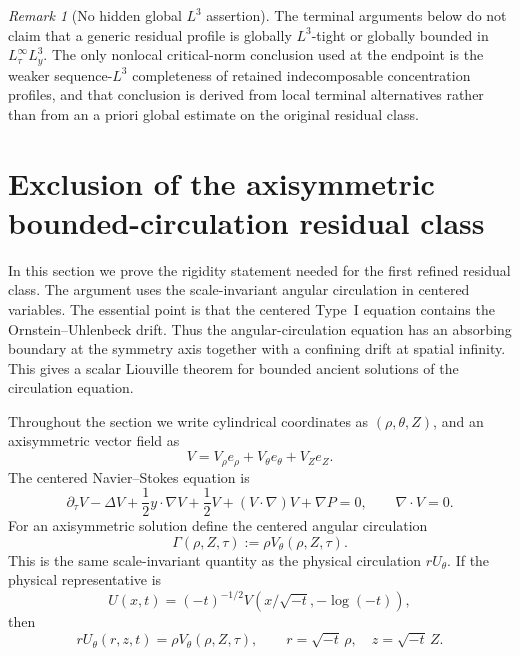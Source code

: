 \documentclass[11pt]{amsart}
\numberwithin{equation}{section}
\theoremstyle{plain}
\theoremstyle{definition}
\theoremstyle{remark}
\newtheorem{remark}[theorem]{Remark}
\begin{document}
\begin{remark}[No hidden global \(L^3\) assertion]
\label{rem:no-hidden-global-L3}
The terminal arguments below do not claim that a generic residual profile is
globally \(L^3\)-tight or globally bounded in \(L^\infty_\tau L^3_y\).  The
only nonlocal critical-norm conclusion used at the endpoint is the weaker
sequence-\(L^3\) completeness of retained indecomposable concentration
profiles, and that conclusion is derived from local terminal alternatives rather than from an
a priori global estimate on the original residual class.
\end{remark}

\section{Exclusion of the axisymmetric bounded-circulation residual class}
\label{sec:R1-exclusion}

In this section we prove the rigidity statement needed for the first refined
residual class.  The argument uses the scale-invariant angular circulation in
centered variables.  The essential point is that the centered Type~I equation
contains the Ornstein--Uhlenbeck drift.  Thus the angular-circulation equation
has an absorbing boundary at the symmetry axis together with a confining drift
at spatial infinity.  This gives a scalar Liouville theorem for bounded ancient
solutions of the circulation equation.

Throughout the section we write cylindrical coordinates as
\((\rho,\theta,Z)\), and an axisymmetric vector field as
\[
   V=V_\rho e_\rho+V_\theta e_\theta+V_Z e_Z .
\]
The centered Navier--Stokes equation is
\begin{equation}\label{eq:centered-R1}
   \partial_\tau V-\Delta V+\frac12 y\cdot\nabla V+\frac12 V
   +(V\cdot\nabla)V+\nabla P=0,
   \qquad \nabla\cdot V=0 .
\end{equation}
For an axisymmetric solution define the centered angular circulation
\begin{equation}\label{eq:centered-Gamma-def}
   \Gamma(\rho,Z,\tau):=\rho V_\theta(\rho,Z,\tau).
\end{equation}
This is the same scale-invariant quantity as the physical circulation
\(rU_\theta\).  If the physical representative is
\[
   U(x,t)=(-t)^{-1/2}V(x/\sqrt{-t},-\log(-t)),
\]
then
\[
   rU_\theta(r,z,t)=\rho V_\theta(\rho,Z,\tau),
   \qquad r=\sqrt{-t}\,\rho,
   \quad z=\sqrt{-t}\,Z.
\]
\end{document}
